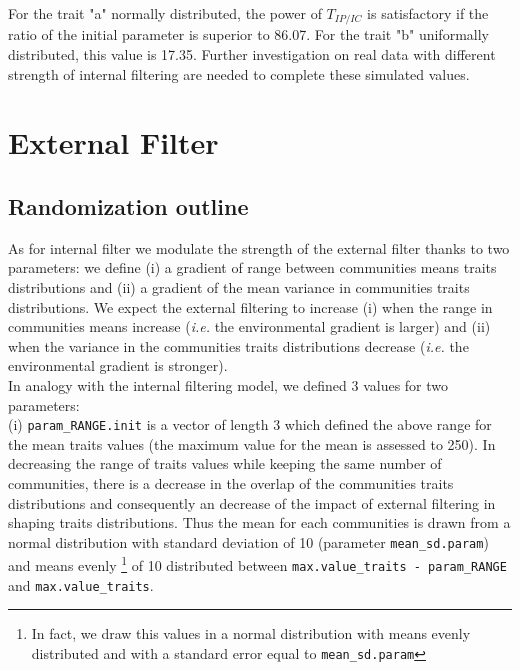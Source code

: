 \documentclass[12pt]{article}\usepackage[]{graphicx}\usepackage[]{color}
\begin{document}
For the trait "a" normally distributed, the power of $T_{IP/IC}$ is satisfactory if the ratio of the initial parameter is superior to
 86.07. For the trait "b" uniformally distributed, this value is 17.35. 
 Further investigation on real data with different strength of internal filtering are needed to complete these simulated values.

 

























\cleardoublepage

\section{External Filter}

 \subsection {Randomization outline}
 
As for internal filter we modulate the strength of the external filter thanks to two parameters:
we define (i) a gradient of range between communities means traits distributions and (ii) a gradient of the mean variance in communities traits distributions. We expect the external filtering to increase (i) when the range in communities means increase (\textit{i.e.} the environmental gradient is larger) and (ii) when the variance in the communities traits distributions decrease (\textit{i.e.} the environmental gradient is stronger).
\\

In analogy with the internal filtering model, we defined 3 values for two parameters:
\\

 (i) \texttt{param\_{}RANGE.init} is a vector of length 3 which defined the above range for the mean traits values (the maximum value for the mean is assessed to 250). In decreasing the range of traits values while keeping the same number of communities, there is a decrease in the overlap of the communities traits distributions and consequently an decrease of the impact of external filtering in shaping traits distributions. Thus the mean for each communities is drawn from a normal distribution with standard deviation of 10 (parameter \texttt{mean\_{}sd.param}) and means evenly
\footnote{In fact, we draw this values in a normal distribution with means evenly distributed and with a standard error equal to \texttt{mean\_{}sd.param}}
of 10 distributed between \texttt{max.value\_{}traits - param\_{}RANGE} and \texttt{max.value\_{}traits}.
\\
\end{document}
